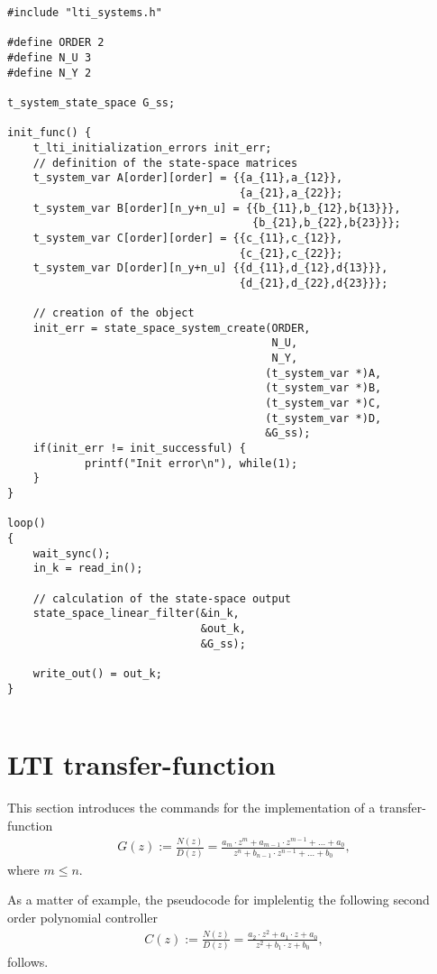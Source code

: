 \documentclass[12pt]{Template_}
\begin{document}
\begin{verbatim}
#include "lti_systems.h"

#define ORDER 2
#define N_U 3
#define N_Y 2

t_system_state_space G_ss;

init_func() {
    t_lti_initialization_errors init_err;
    // definition of the state-space matrices    
    t_system_var A[order][order] = {{a_{11},a_{12}},
                                    {a_{21},a_{22}};
    t_system_var B[order][n_y+n_u] = {{b_{11},b_{12},b{13}}},
                                      {b_{21},b_{22},b{23}}};
    t_system_var C[order][order] = {{c_{11},c_{12}},
                                    {c_{21},c_{22}}; 
    t_system_var D[order][n_y+n_u] {{d_{11},d_{12},d{13}}},
                                    {d_{21},d_{22},d{23}}};
		
    // creation of the object	
    init_err = state_space_system_create(ORDER, 
                                         N_U,
                                         N_Y,
                                        (t_system_var *)A,
                                        (t_system_var *)B,
                                        (t_system_var *)C,
                                        (t_system_var *)D,
                                        &G_ss);
    if(init_err != init_successful) {
            printf("Init error\n"), while(1);
    }
}

loop() 
{
    wait_sync();
    in_k = read_in();
	
    // calculation of the state-space output
    state_space_linear_filter(&in_k, 
                              &out_k, 
                              &G_ss);
							  
    write_out() = out_k;
}
	
\end{verbatim}

\newpage

\section{LTI transfer-function}
This section introduces the commands for the implementation of a transfer-function
\begin{eqnarray*}
 G(z) := \frac{N(z)}{D(z)} = \frac{a_m\cdot z^m+a_{m-1}\cdot z^{m-1}+\ldots+a_0}{z^n+b_{n-1}\cdot z^{n-1}+\ldots+b_0},
\end{eqnarray*}
where $m\leq n$.

As a matter of example, the pseudocode for implelentig the following second order polynomial controller
\begin{eqnarray*}
 C(z) := \frac{N(z)}{D(z)} = \frac{a_2\cdot z^2+a_1\cdot z+a_0}{z^2+b_1\cdot z+b_0},
\end{eqnarray*}
follows.
\end{document}
